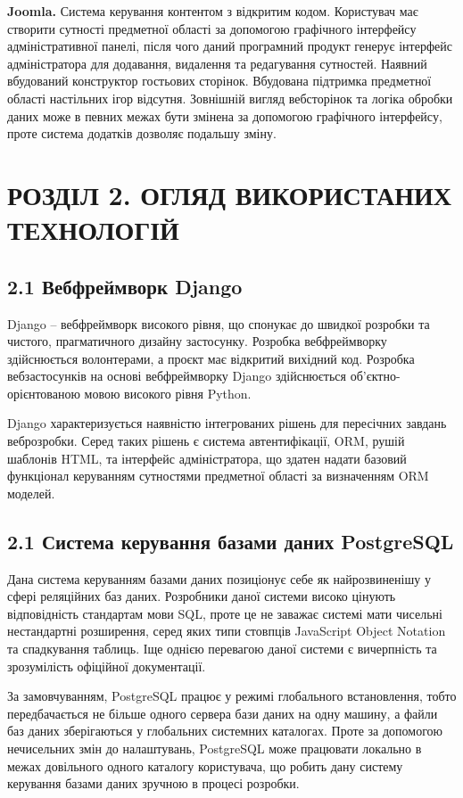 \documentclass[a4paper, 14pt]{extarticle}
\begin{document}
  \textbf{Joomla.} Система керування контентом з відкритим кодом.
  Користувач має створити сутності предметної області за допомогою графічного
  інтерфейсу адміністративної панелі, після
  чого даний програмний продукт генерує інтерфейс адміністратора для додавання, видалення
  та редагування сутностей. Наявний вбудований конструктор гостьових сторінок.
  Вбудована підтримка предметної області настільних ігор відсутня. Зовнішній вигляд
  вебсторінок та логіка обробки даних може в певних межах бути змінена за допомогою
  графічного інтерфейсу, проте система додатків дозволяє подальшу зміну.


  \clearpage
  \section{РОЗДІЛ 2. ОГЛЯД ВИКОРИСТАНИХ ТЕХНОЛОГІЙ}

  \subsection{2.1 Вебфреймворк Django}
  Django -- вебфреймворк високого рівня, що спонукає до швидкої розробки та чистого,
  прагматичного дизайну застосунку. Розробка вебфреймворку здійснюється волонтерами,
  а проєкт має відкритий вихідний код. Розробка вебзастосунків на основі
  вебфреймворку Django здійснюється об'єктно-орієнтованою мовою високого рівня Python.

  Django характеризується наявністю інтегрованих рішень для пересічних завдань
  веброзробки. Серед таких рішень є система автентифікації, ORM, рушій шаблонів HTML,
  та інтерфейс адміністратора, що здатен надати базовий функціонал керуванням
  сутностями предметної області за визначенням ORM моделей.

  \subsection{2.1 Система керування базами даних PostgreSQL}
  Дана система керуванням базами даних позиціонує себе як найрозвиненішу у сфері
  реляційних баз даних. Розробники даної системи високо цінують відповідність стандартам
  мови SQL, проте це не заважає системі мати чисельні нестандартні розширення,
  серед яких типи стовпців JavaScript Object Notation та спадкування таблиць. Іще однією
  перевагою даної системи є вичерпність та зрозумілість офіційної документації.

  За замовчуванням, PostgreSQL працює у режимі глобального встановлення, тобто передбачається
  не більше одного сервера бази даних на одну машину, а файли баз даних зберігаються
  у глобальних системних каталогах. Проте за допомогою нечисельних змін до
  налаштувань, PostgreSQL може працювати локально в межах довільного одного каталогу
  користувача, що робить дану систему керування базами даних зручною в процесі
  розробки.
\end{document}
